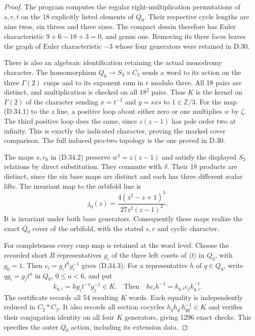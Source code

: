 \begin{proof}
The program computes the regular right-multiplication permutations of
$s,r,t$ on the 18 explicitly listed elements of $Q_0$. Their respective
cycle lengths are nine twos, six threes and three sixes. The compact
dessin therefore has Euler characteristic $9+6-18+3=0$, and genus one.
Removing its three faces leaves the graph of Euler characteristic
$-3$ whose four generators were retained in D.30.

There is also an algebraic identification retaining the actual
monodromy character. The homomorphism
$Q_0\to S_3\times C_3$ sends a word to its action on the three
$\Gamma(2)$ cusps and to its exponent sum in $r$ modulo three.
All 18 pairs are distinct, and multiplication is checked on all
$18^2$ pairs. Thus $K$ is the kernel on $\Gamma(2)$ of the character
sending $x=t^{-2}$ and $y=sxs$ to $1\in\mathbb Z/3$.
For the map (D.34.1) to the $z$ line, a positive loop about either
zero or one multiplies $w$ by $\zeta$. The third positive loop does
the same, since $z(z-1)$ has pole order two at infinity. This is
exactly the indicated character, proving the marked cover comparison.
The full induced pro-two topology is the one proved in D.30.

The maps $s,r_0$ in (D.34.2) preserve $w^3=z(z-1)$ and satisfy the
displayed $S_3$ relations by direct substitution. They commute with
$\delta$. Their 18 products are distinct, since the six base maps
are distinct and each has three different scalar lifts. The invariant
map to the orbifold line is
\[
 j_0(z)=\frac{4(z^2-z+1)^3}{27z^2(z-1)^2}.
                                                               \tag{D.34.12}
\]
It is invariant under both base generators. Consequently these maps
realize the exact $Q_0$ cover of the orbifold, with the stated $s,r$
and cyclic character.

For completeness every cusp map is retained at the word level. Choose
the recorded short $B$ representatives $g_i$ of the three left cosets
of $\langle t\rangle$ in $Q_0$, with $g_0=1$. Then
$c_i=g_it^6g_i^{-1}$ gives (D.34.3). For a representative $h$ of
$q\in Q_0$, write $qg_i=g_jt^a$ in $Q_0$, $0\leq a<6$, and put
\[
 k_{q,i}=hg_it^{-a}g_j^{-1}\in K.
 \quad\text{Then}\quad hc_ih^{-1}=k_{q,i}c_jk_{q,i}^{-1}.
                                                               \tag{D.34.13}
\]
The certificate records all 54 resulting $K$ words. Each equality
is independently reduced in $C_2*C_3$. It also records all section
cocycles $h_qh_{q'}h_{qq'}^{-1}\in K$ and verifies their conjugation
identity on all four $K$ generators, giving 1296 exact checks. This
specifies the outer $Q_0$ action, including its extension data.


\end{proof}
